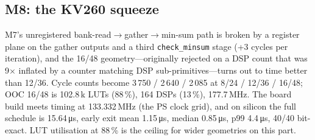 \subsection*{M8: the KV260 squeeze}
M7's unregistered bank-read$\to$gather$\to$min-sum path is broken by a
register plane on the gather outputs and a third \texttt{check\_minsum}
stage (+3 cycles per iteration), and the 16/48 geometry---originally
rejected on a DSP count that was 9$\times$ inflated by a counter matching
DSP sub-primitives---turns out to time better than 12/36. Cycle counts
become 3\,750 / 2\,640 / 2\,085 at 8/24 / 12/36 / 16/48; OOC 16/48 is
102.8\,k LUTs (88\,\%), 164 DSPs (13\,\%), 177.7\,MHz.
The board build meets timing at 133.332\,MHz (the PS clock grid), and on
silicon the full schedule is 15.64\,\si{\micro\second}, early exit
mean 1.15\,\si{\micro\second}, median 0.85\,\si{\micro\second},
p99 4.4\,\si{\micro\second}, 40/40 bit-exact. LUT utilisation at 88\,\% is
the ceiling for wider geometries on this part.

